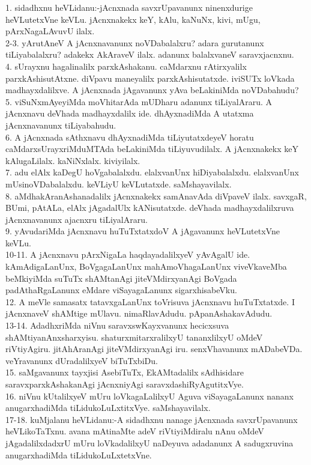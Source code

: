 \documentclass{article}
\begin{document}
1. sidadhxnu heVLidanu:-jAcnxnada savxrUpavanunx ninenxdurige heVLutetxVne keVLu. jAcnxnakekx keY, kAlu, kaNuNx, kivi, mUgu, pArxNagaLAvuvU ilalx.\\
2-3. yArutAneV A jAcnxnavanunx noVDabalalxru? adara gurutanunx tiLiyabalalxru? adakekx AkAraveV ilalx. adanunx balalxvaneV saravxjacnxnu.\\
4. sUrayxnu hagalinalilx parxkAshakanu. caMdarxnu rAtirxyalilx parxkAshisutAtxne. diVpavu maneyalilx parxkAshisutatxde. iviSUTx loVkada madhayxdalilxve. A jAcnxnada jAgavanunx yAva beLakiniMda noVDabahudu?\\
5. viSuNxmAyeyiMda moVhitarAda mUDharu adanunx tiLiyalAraru. A jAcnxnavu deVhada madhayxdalilx ide. dhAyxnadiMda A utatxma jAcnxnavanunx tiLiyabahudu.\\
6. A jAcnxnada sAthxnavu dhAyxnadiMda tiLiyutatxdeyeV horatu caMdarxsUrayxriMduMTAda beLakiniMda tiLiyuvudilalx. A jAcnxnakekx keY kAlugaLilalx. kaNiNxlalx. kiviyilalx.\\
7. adu elAlx kaDegU hoVgabalalxdu. elalxvanUnx hiDiyabalalxdu. elalxvanUnx mUsinoVDabalalxdu. keVLiyU keVLutatxde. saMshayavilalx.\\
8. aMdhakAranAshanadalilx jAcnxnakekx samAnavAda diVpaveV ilalx. savxgaR, BUmi, pAtALa, elAlx jAgadalUlx kANisutatxde. deVhada madhayxdalilxruva jAcnxnavanunx ajacnxru tiLiyalAraru.\\
9. yAvudariMda jAcnxnavu huTuTxtatxdoV A jAgavanunx heVLutetxVne keVLu.\\
10-11. A jAcnxnavu pArxNigaLa haqdayadalilxyeV yAvAgalU ide. kAmAdigaLanUnx, BoVgagaLanUnx mahAmoVhagaLanUnx viveVkaveMba beMkiyiMda suTuTx shAMtanAgi jiteVMdirxyanAgi BoVgada padAthaRgaLanunx eMdare viSayagaLanunx sigarxhisabeVku.\\
12. A meVle samasatx tatavxgaLanUnx toVrisuva jAcnxnavu huTuTxtatxde. I jAcnxnaveV shAMtige mUlavu. nimaRlavAdudu. pApanAshakavAdudu.\\
13-14. AdadhxriMda niVnu saravxswKayxvanunx hecicxsuva shAMtiyanAnxsharxyisu. shaturxmitarxralilxyU tananxlilxyU oMdeV riVtiyAgiru. jitAhAranAgi jiteVMdirxyanAgi iru. senxVhavanunx mADabeVDa. veYravanunx dUradalilxyeV biTuTxbiDu.\\
15. saMgavanunx tayxjisi AsebiTuTx, EkAMtadalilx sAdhisidare saravxparxkAshakanAgi jAcnxniyAgi saravxdashiRyAgutitxVye.\\
16. niVnu kUtalilxyeV mUru loVkagaLalilxyU Aguva viSayagaLanunx nananx anugarxhadiMda tiLidukoLuLxtitxVye. saMshayavilalx.\\
17-18. kuMjalanu heVLidanu:-A sidadhxnu nanage jAcnxnada savxrUpavanunx heVLikoTaTxnu. avana mAtinaMte adeV riVtiyiMdiralu nAnu oMdeV jAgadalilxdadxrU mUru loVkadalilxyU naDeyuva adadanunx A sadugxruvina anugarxhadiMda tiLidukoLuLxtetxVne.\\
\end{document}
